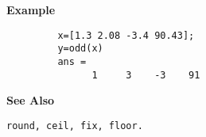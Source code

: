 {\bf \large \sf Example}
\begin{verbatim}
         x=[1.3 2.08 -3.4 90.43]; 
         y=odd(x)
         ans = 
               1     3    -3    91

\end{verbatim}
\vspace*{.5cm}

{\bf \large \sf See Also}\\
\hspace*{1.5cm}
\begin{minipage}[t]{13.5cm}
\begin{verbatim}
round, ceil, fix, floor.
\end{verbatim}
\end{minipage}

